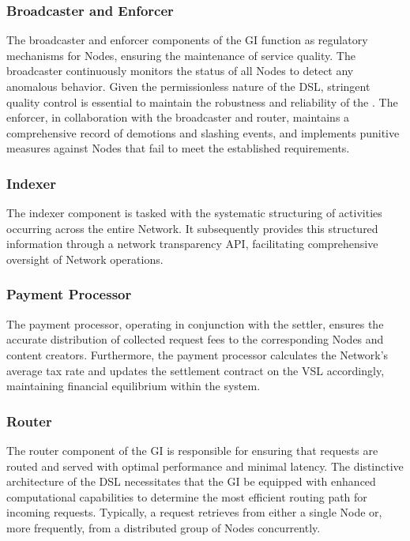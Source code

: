 \subsubsection{Broadcaster and Enforcer}
The broadcaster and enforcer components of the \gls{GI} function as regulatory mechanisms for \glspl{Node}, ensuring the maintenance of service quality. The broadcaster continuously monitors the status of all \glspl{Node} to detect any anomalous behavior. Given the permissionless nature of the \gls{DSL}, stringent quality control is essential to maintain the robustness and reliability of the .
The enforcer, in collaboration with the broadcaster and router, maintains a comprehensive record of demotions and slashing events, and implements punitive measures against \glspl{Node} that fail to meet the established requirements.

\subsubsection{Indexer}
The indexer component is tasked with the systematic structuring of activities occurring across the entire Network. It subsequently provides this structured information through a network transparency API, facilitating comprehensive oversight of Network operations.

\subsubsection{Payment Processor}
The payment processor, operating in conjunction with the settler, ensures the accurate distribution of collected request fees to the corresponding \glspl{Node} and content creators.
Furthermore, the payment processor calculates the Network's average tax rate and updates the settlement contract on the \gls{VSL} accordingly, maintaining financial equilibrium within the system.

\subsubsection{Router}
The router component of the \gls{GI} is responsible for ensuring that requests are routed and served with optimal performance and minimal latency.
The distinctive architecture of the \gls{DSL} necessitates that the \gls{GI} be equipped with enhanced computational capabilities to determine the most efficient routing path for incoming requests. Typically, a request retrieves  from either a single \gls{Node} or, more frequently, from a distributed group of \glspl{Node} concurrently.

